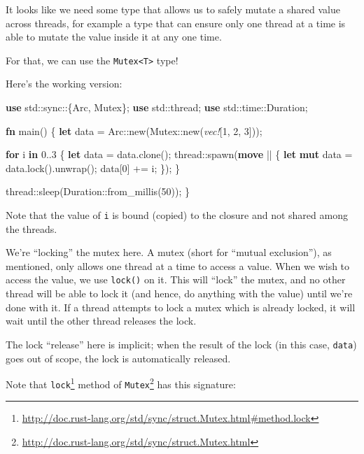 \documentclass[a4paper,]{book}
\newenvironment{Shaded}{\begin{snugshade}}{\end{snugshade}}
\newcommand{\KeywordTok}[1]{\textcolor[rgb]{0.13,0.29,0.53}{\textbf{{#1}}}}
\newcommand{\DecValTok}[1]{\textcolor[rgb]{0.00,0.00,0.81}{{#1}}}
\newcommand{\PreprocessorTok}[1]{\textcolor[rgb]{0.56,0.35,0.01}{\textit{{#1}}}}
\newcommand{\NormalTok}[1]{{#1}}
\renewcommand{\href}[2]{#2\footnote{\url{#1}}}
\begin{document}
It looks like we need some type that allows us to safely mutate a shared
value across threads, for example a type that can ensure only one thread
at a time is able to mutate the value inside it at any one time.

For that, we can use the \texttt{Mutex\textless{}T\textgreater{}} type!

Here's the working version:

\begin{Shaded}
\begin{Highlighting}[]
\KeywordTok{use} \NormalTok{std::sync::\{Arc, Mutex\};}
\KeywordTok{use} \NormalTok{std::thread;}
\KeywordTok{use} \NormalTok{std::time::Duration;}

\KeywordTok{fn} \NormalTok{main() \{}
    \KeywordTok{let} \NormalTok{data = Arc::new(Mutex::new(}\PreprocessorTok{vec!}\NormalTok{[}\DecValTok{1}\NormalTok{, }\DecValTok{2}\NormalTok{, }\DecValTok{3}\NormalTok{]));}

    \KeywordTok{for} \NormalTok{i }\KeywordTok{in} \DecValTok{0.}\NormalTok{.}\DecValTok{3} \NormalTok{\{}
        \KeywordTok{let} \NormalTok{data = data.clone();}
        \NormalTok{thread::spawn(}\KeywordTok{move} \NormalTok{|| \{}
            \KeywordTok{let} \KeywordTok{mut} \NormalTok{data = data.lock().unwrap();}
            \NormalTok{data[}\DecValTok{0}\NormalTok{] += i;}
        \NormalTok{\});}
    \NormalTok{\}}

    \NormalTok{thread::sleep(Duration::from_millis(}\DecValTok{50}\NormalTok{));}
\NormalTok{\}}
\end{Highlighting}
\end{Shaded}

Note that the value of \texttt{i} is bound (copied) to the closure and
not shared among the threads.

We're ``locking'' the mutex here. A mutex (short for ``mutual
exclusion''), as mentioned, only allows one thread at a time to access a
value. When we wish to access the value, we use \texttt{lock()} on it.
This will ``lock'' the mutex, and no other thread will be able to lock
it (and hence, do anything with the value) until we're done with it. If
a thread attempts to lock a mutex which is already locked, it will wait
until the other thread releases the lock.

The lock ``release'' here is implicit; when the result of the lock (in
this case, \texttt{data}) goes out of scope, the lock is automatically
released.

Note that
\href{http://doc.rust-lang.org/std/sync/struct.Mutex.html\#method.lock}{\texttt{lock}}
method of
\href{http://doc.rust-lang.org/std/sync/struct.Mutex.html}{\texttt{Mutex}}
has this signature:
\end{document}
